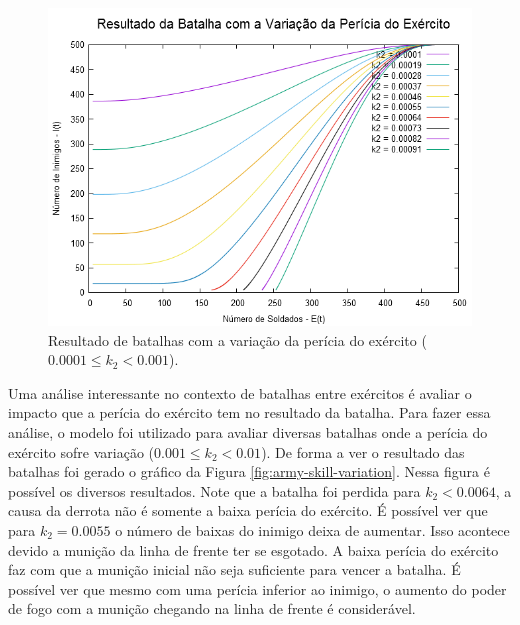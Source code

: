 \documentclass{article}
\begin{document}
\begin{figure}[ht]
	\centering
	\includegraphics[scale=0.3]{figs/battle_army_skill_variation_2.png}
	\caption{Resultado de batalhas com a variação da perícia do exército ($0.0001 \leq k_2 < 0.001$).}
	\label{fig:army-skill-variation2}
\end{figure}

Uma análise interessante no contexto de batalhas entre exércitos é avaliar o impacto que a perícia do exército tem no resultado da batalha. Para fazer essa análise, o modelo foi utilizado para avaliar diversas batalhas onde a perícia do exército sofre variação ($0.001 \leq k_2 < 0.01$). De forma a ver o resultado das batalhas foi gerado o gráfico da Figura \ref{fig:army-skill-variation}. Nessa figura é possível os diversos resultados. Note que a batalha foi perdida para $k_2 < 0.0064$, a causa da derrota não é somente a baixa perícia do exército. É possível ver que para $k_2 = 0.0055$ o número de baixas do inimigo deixa de aumentar. Isso acontece devido a munição da linha de frente ter se esgotado. A baixa perícia do exército faz com que a munição inicial não seja suficiente para vencer a batalha. É possível ver que mesmo com uma perícia inferior ao inimigo, o aumento do poder de fogo com a munição chegando na linha de frente é considerável.
\end{document}
